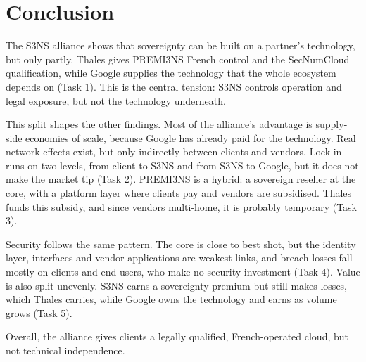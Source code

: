 \section{Conclusion}
\label{sec:conclusion}

The S3NS alliance shows that sovereignty can be built on a partner's technology, but only partly. Thales gives PREMI3NS French control and the SecNumCloud qualification, while Google supplies the technology that the whole ecosystem depends on (Task 1). This is the central tension: S3NS controls operation and legal exposure, but not the technology underneath.

This split shapes the other findings. Most of the alliance's advantage is supply-side economies of scale, because Google has already paid for the technology. Real network effects exist, but only indirectly between clients and vendors. Lock-in runs on two levels, from client to S3NS and from S3NS to Google, but it does not make the market tip (Task 2). PREMI3NS is a hybrid: a sovereign reseller at the core, with a platform layer where clients pay and vendors are subsidised. Thales funds this subsidy, and since vendors multi-home, it is probably temporary (Task 3).

Security follows the same pattern. The core is close to best shot, but the identity layer, interfaces and vendor applications are weakest links, and breach losses fall mostly on clients and end users, who make no security investment (Task 4). Value is also split unevenly. S3NS earns a sovereignty premium but still makes losses, which Thales carries, while Google owns the technology and earns as volume grows (Task 5).

Overall, the alliance gives clients a legally qualified, French-operated cloud, but not technical independence.

